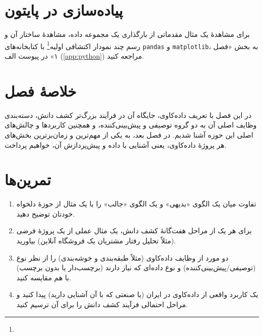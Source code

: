 \section*{پیاده‌سازی در پایتون}

برای مشاهدهٔ یک مثال مقدماتی از بارگذاری یک مجموعه داده، مشاهدهٔ ساختار آن
و رسم چند نمودار اکتشافی اولیه\footnote{}
با کتابخانه‌های
\texttt{pandas} و \texttt{matplotlib}، به بخش «فصل ۱» در پیوست الف
(\ref{app:python}) مراجعه کنید.

\section*{خلاصهٔ فصل}

در این فصل با تعریف داده‌کاوی، جایگاه آن در فرآیند بزرگ‌تر کشف دانش، دسته‌بندی
وظایف اصلی آن به دو گروه توصیفی و پیش‌بینی‌کننده، و همچنین کاربردها و
چالش‌های اصلی این حوزه آشنا شدیم. در فصل بعد، به یکی از مهم‌ترین و
زمان‌برترین بخش‌های هر پروژهٔ داده‌کاوی، یعنی آشنایی با داده و پیش‌پردازش
آن، خواهیم پرداخت.

\section*{تمرین‌ها}

\begin{enumerate}
    \item تفاوت میان یک الگوی «بدیهی» و یک الگوی «جالب» را با یک مثال از
          حوزهٔ دلخواه خودتان توضیح دهید.
    \item برای هر یک از مراحل هفت‌گانهٔ کشف دانش، یک مثال عملی از یک پروژهٔ
          فرضی (مثلاً تحلیل رفتار مشتریان یک فروشگاه آنلاین) بیاورید.
    \item دو مورد از وظایف داده‌کاوی (مثلاً طبقه‌بندی و خوشه‌بندی) را از
          نظر نوع (توصیفی/پیش‌بینی‌کننده) و نوع داده‌ای که نیاز دارند
          (برچسب‌دار یا بدون برچسب) با هم مقایسه کنید.
    \item یک کاربرد واقعی از داده‌کاوی در ایران (یا صنعتی که با آن آشنایی
          دارید) پیدا کنید و مراحل احتمالی فرآیند کشف دانش را برای آن ترسیم کنید.
\end{enumerate}
